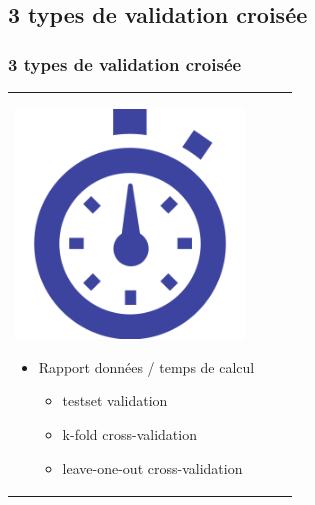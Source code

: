 \documentclass[handout]{beamer}
\begin{document}
	\subsection{3 types de validation croisée}
		\begin{frame}
		\frametitle{3 types de validation croisée}
		\begin{tabular}{l l}
			\begin{minipage}{0.2\textwidth}
				\begin{center}
					\includegraphics[width=0.9\textwidth]{images/clock.png}
				\end{center}
			\end{minipage}

			\begin{minipage}{0.8\textwidth}
				\begin{itemize}
					\item Rapport données / temps de calcul 
					\begin{itemize}
						\item testset validation
						\item k-fold cross-validation
						\item leave-one-out cross-validation
					\end{itemize}
				\end{itemize}
			\end{minipage}

		\end{tabular}
		\end{frame}
\end{document}
